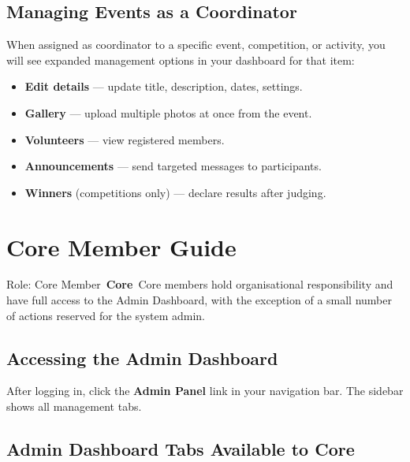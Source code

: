 \documentclass[12pt,a4paper]{article}
\newcommand{\rolebadge}[2]{%
  \colorbox{#1}{\color{white}\,\textbf{\footnotesize #2}\,}%
}
\begin{document}
\subsection{Managing Events as a Coordinator}

When assigned as coordinator to a specific event, competition, or activity, you will see expanded management options in your dashboard for that item:

\begin{itemize}
  \item \textbf{Edit details} --- update title, description, dates, settings.
  \item \textbf{Gallery} --- upload multiple photos at once from the event.
  \item \textbf{Volunteers} --- view registered members.
  \item \textbf{Announcements} --- send targeted messages to participants.
  \item \textbf{Winners} (competitions only) --- declare results after judging.
\end{itemize}

\section{Core Member Guide}
\label{sec:core}

\begin{rolebox}[CoreColor]{Role: Core Member \rolebadge{CoreColor}{Core}}
Core members hold organisational responsibility and have full access to the Admin Dashboard, with the exception of a small number of actions reserved for the system admin.
\end{rolebox}

\subsection{Accessing the Admin Dashboard}

After logging in, click the \textbf{Admin Panel} link in your navigation bar. The sidebar shows all management tabs.

\subsection{Admin Dashboard Tabs Available to Core}
\end{document}
